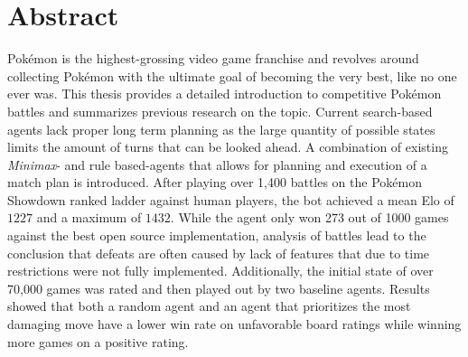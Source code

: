 \chapter*{Abstract}
Pokémon is the highest-grossing video game franchise and revolves around collecting Pokémon with the 
ultimate goal of becoming \grqq the very best, like no one ever was\grqq. This thesis provides a detailed
introduction to competitive Pokémon battles and summarizes previous research on the topic. Current
search-based agents lack proper long term planning as the large quantity of possible states limits
the amount of turns that can be looked ahead. A combination of existing \textit{Minimax}-
and rule based-agents that allows for planning and execution of a match plan is introduced.
After playing over 1,400 battles on the Pokémon Showdown ranked ladder against human players,
the bot achieved a mean Elo of $1227$ and a maximum of $1432$. While the agent only won 273 out of 
1000 games against the best open source implementation, analysis of battles lead to the conclusion that defeats
are often caused by lack of features that due to time restrictions were not fully implemented. 
Additionally, the initial state of over 70,000 games was rated and then played out by two baseline 
agents. Results showed that both a random agent and an agent that prioritizes the most damaging
move have a lower win rate on unfavorable board ratings while winning more games on a positive rating. 
